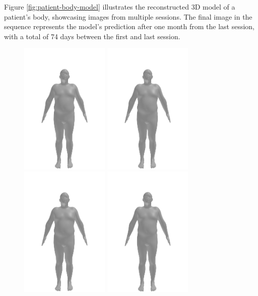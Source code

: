 Figure \ref{fig:patient-body-model} illustrates the reconstructed 3D model of a
patient's body, showcasing images from multiple sessions. The final image in
the sequence represents the model's prediction after one month from the last
session, with a total of 74 days between the first and last session.

\begin{figure}[h]
    \centering
    \includegraphics[width=120pt]{files/patients/2_6}
    \includegraphics[width=120pt]{files/patients/2_7}
    \includegraphics[width=120pt]{files/patients/2_8}
    \includegraphics[width=120pt]{files/patients/2_9}

\end{figure}
